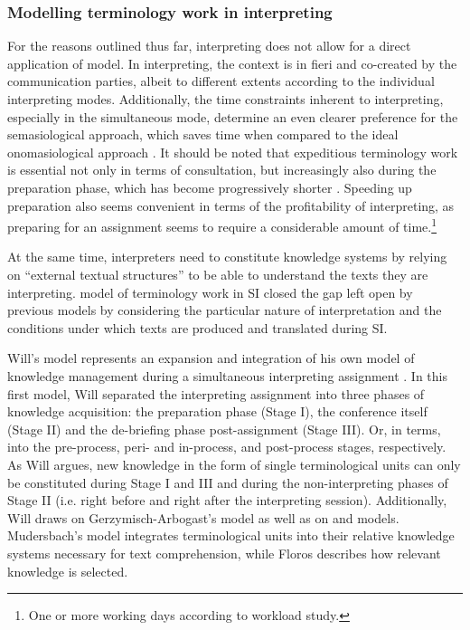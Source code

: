 \subsubsection{Modelling terminology work in interpreting} \label{termwmodels}
For the reasons outlined thus far, interpreting does not allow for a direct application of  model. In interpreting, the context is in fieri and co-created by the communication parties, albeit to different extents according to the individual interpreting modes. Additionally, the time constraints inherent to interpreting, especially in the simultaneous mode, determine an even clearer preference for the semasiological approach, which saves time when compared to the ideal onomasiological approach \citep[168]{mikkelsen_arntz_1991}. It should be noted that expeditious terminology work is essential not only in terms of consultation, but increasingly also during the preparation phase, which has become progressively shorter \citep{rutten2008zielgerichtet}. Speeding up preparation also seems convenient in terms of the profitability of interpreting, as preparing for an assignment seems to require a considerable amount of time.\footnote{One or more working days according to  workload study.}

At the same time, interpreters need to constitute knowledge systems by relying on ``external textual structures'' \citep[67]{will_terminology_2007} to be able to understand the texts they are interpreting.  model of terminology work in SI closed the gap left open by previous models by considering the particular nature of interpretation and the conditions under which texts are produced and translated during SI.

Will's model represents an expansion and integration of his own model of knowledge management during a simultaneous interpreting assignment \citep{will_bemerkungen_2000}. In this first model, Will separated the interpreting assignment into three phases of knowledge acquisition: the preparation phase (Stage I), the conference itself (Stage II) and the de-briefing phase post-assignment (Stage III). Or, in  terms, into the pre-process, peri- and in-process, and post-process stages, respectively. As Will argues, new knowledge in the form of single terminological units can only be constituted during Stage I and III and during the non-interpreting phases of Stage II (i.e. right before and right after the interpreting session). Additionally, Will draws on Gerzymisch-Arbogast's model as well as on  and  models. Mudersbach's model integrates terminological units into their relative knowledge systems necessary for text comprehension, while Floros describes how relevant knowledge is selected.


